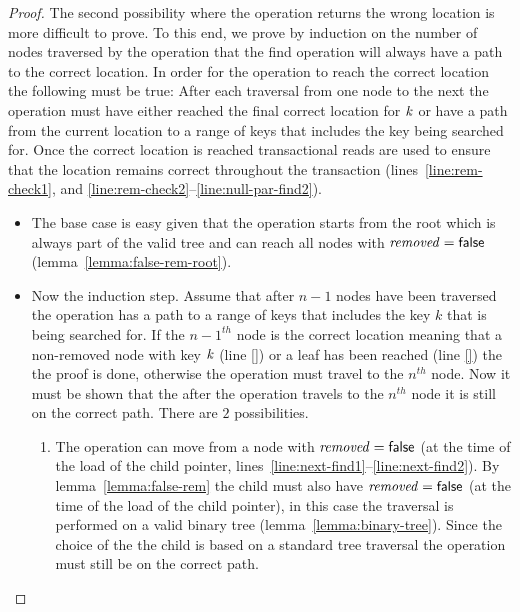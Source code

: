 \begin{proof}
The second possibility where the operation returns the wrong location is more difficult to prove.
To this end, we prove by induction on the number of nodes traversed by the operation that
the find operation will always have a path
to the correct location.
In order for the operation to reach the correct location the following must be true:
After each traversal from one node to the next the operation must have either reached the final correct location for $\ms{k}$
or have a path from the current location to a range of keys that includes the key being searched for.
Once the correct location is reached transactional reads are used to ensure that the location remains correct throughout the transaction
(lines~\ref{line:rem-check1}, and \ref{line:rem-check2}--\ref{line:null-par-find2}).
\begin{itemize}
\item The base case is easy given that the operation starts from the root which is always part of the valid tree and can reach
all nodes with $\ms{removed}=\lit{false}$ (lemma~\ref{lemma:false-rem-root}).
%
\item Now the induction step.
Assume that after $n-1$ nodes have been traversed the operation has a path to a range of keys that includes the key $k$ that is being searched for.
If the $n-1^{th}$ node is the correct location
meaning that a non-removed node with key $\ms{k}$ (line \ref{}) or a leaf has been reached (line \ref{})
the the proof is done, otherwise the operation must travel to the $n^{th}$ node.
Now it must be shown that the after the operation travels to the $n^{th}$ node it is still on the correct path.
%
There are $2$ possibilities.
\begin{enumerate}
\item The operation can move from a node with $\ms{removed}=\lit{false}$ (at the time of the load of the child pointer, lines~\ref{line:next-find1}--\ref{line:next-find2}).
By lemma~\ref{lemma:false-rem} the child must also have $\ms{removed}=\lit{false}$ (at the time of the load of the child pointer),
in this case the traversal is performed on a valid binary tree (lemma~\ref{lemma:binary-tree}).
Since the choice of the the child is based on a standard tree traversal the operation must still be on the correct path.


\end{enumerate}
\end{itemize}
\end{proof}
